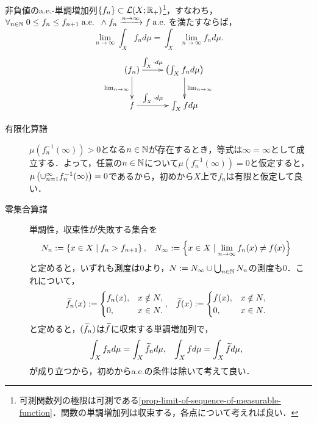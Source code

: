 \documentclass[uplatex, dvipdfmx]{jsreport}
\begin{document}
\begin{theorem}\label{thm-monotone-convergence-theorem}
    非負値のa.e.-単調増加列$\{f_n\}\subset\mathcal{L}(X;\mathbb{R}_+)$\footnote{可測関数列の極限は可測である\ref{prop-limit-of-sequence-of-measurable-function}．関数の単調増加列は収束する，各点について考えれば良い．}，すなわち，$\forall_{n\in\mathbb{N}}\;0\le f_n\le f_{n+1}\;\mathrm{a.e.}\;\;\land f_n\xrightarrow{n\to\infty}f\;\mathrm{a.e.}\;$を満たすならば，
    \[\lim_{n\to\infty}\int_Xf_nd\mu=\int_X\lim_{n\to\infty}f_nd\mu.\]
    \[\xymatrix{
        (f_n)\ar[r]^-{\int_X\cdot d\mu}\ar[d]_-{\lim_{n\to\infty}}&\paren{\int_Xf_nd\mu}\ar[d]^-{\lim_{n\to\infty}}\\
        f\ar[r]^-{\int_X\cdot d\mu}&\int_Xfd\mu
    }\]
\end{theorem}
\begin{Proof}\mbox{}
    \begin{description}
        \item[有限化算譜] $\mu(f_n^{-1}(\infty))>0$となる$n\in\mathbb{N}$が存在するとき，等式は$\infty=\infty$として成立する．よって，任意の$n\in\mathbb{N}$について$\mu(f_n^{-1}(\infty))=0$と仮定すると，$\mu\left(\cup_{n=1}^\infty f_n^{-1}(\infty)\right)=0$であるから，初めから$X$上で$f_n$は有限と仮定して良い．
        \item[零集合算譜] 単調性，収束性が失敗する集合を
        \begin{align*}
            N_n&:=\left\{x\in X\mid f_n>f_{n+1}\right\},&N_\infty&:=\left\{x\in X\mid\lim_{n\to\infty}f_n(x)\ne f(x)\right\}
        \end{align*}
        と定めると，いずれも測度は$0$より，$N:=N_\infty\cup\bigcup_{n\in\mathbb{N}}N_n$の測度も$0$．これについて，
        \begin{align*}
            \widetilde{f}_n(x)&:=\begin{cases}
                f_n(x),&x\notin N,\\
                0,&x\in N.
            \end{cases},&\widetilde{f}(x)&:=\begin{cases}
                f(x),&x\notin N,\\
                0,&x\in N.
            \end{cases}
        \end{align*}
        と定めると，$(\widetilde{f}_n)$は$\widetilde{f}$に収束する単調増加列で，
        \begin{align*}
            \int_Xf_nd\mu&=\int_X\widetilde{f}_nd\mu,&\int_Xfd\mu&=\int_X\widetilde{f}d\mu,
        \end{align*}
        が成り立つから，初めからa.e.の条件は除いて考えて良い．

\end{description}
\end{Proof}
\end{document}
